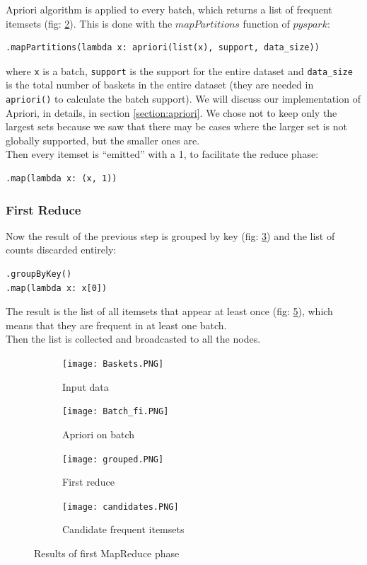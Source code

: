 \documentclass[a4paper]{article}
\begin{document}
	Apriori algorithm is applied to every batch, which returns a list of frequent itemsets (fig: \ref{fig:apriori}). This is done with the $mapPartitions$ function of $pyspark$: 
	\begin{lstlisting}[numbers=none]
.mapPartitions(lambda x: apriori(list(x), support, data_size))
\end{lstlisting}
	where \texttt{x} is a batch, \texttt{support} is the support for the entire dataset and \texttt{data\_size} is the total number of baskets in the entire dataset (they are needed in \texttt{apriori()} to calculate the batch support).
	We will discuss our implementation of Apriori, in details, in section \ref{section:apriori}. We chose not to keep only the largest sets because we saw that there may be cases where the larger set is not globally supported, but the smaller ones are.\\
	Then every itemset is ``emitted'' with a 1, to facilitate the reduce phase:
	\begin{lstlisting}[numbers=none]
.map(lambda x: (x, 1))
\end{lstlisting}
	
	\subsubsection{First Reduce}
	Now the result of the previous step is grouped by key (fig: \ref{fig:grouped}) and the list of counts discarded entirely:
	\begin{lstlisting}
.groupByKey()
.map(lambda x: x[0])
\end{lstlisting}
	The result is the list of all itemsets that appear at least once (fig: \ref{fig:candidate_fi}), which means that they are frequent in at least one batch.\\
	Then the list is collected and broadcasted to all the nodes.
	
	\begin{figure}[h]
		\centering
		
		\begin{subfigure}[b]{0.24\textwidth}
			\centering
			\texttt{[image: Baskets.PNG]}
         	\caption{Input data}
         	\label{fig:input_data}
		\end{subfigure}
		\hfill
		\begin{subfigure}[b]{0.24\textwidth}
			\centering
			\texttt{[image: Batch\_fi.PNG]}
         	\caption{Apriori on batch}
         	\label{fig:apriori}
		\end{subfigure}
		\hfill
		\begin{subfigure}[b]{0.24\textwidth}
			\centering
			\texttt{[image: grouped.PNG]}
         	\caption{First reduce}
         	\label{fig:grouped}
		\end{subfigure}
		\hfill
		\begin{subfigure}[b]{0.24\textwidth}
			\centering
			\texttt{[image: candidates.PNG]}
         	\caption{Candidate frequent itemsets}
         	\label{fig:candidate_fi}
		\end{subfigure}
	\caption{Results of first MapReduce phase}
	\end{figure}
	
\end{document}
